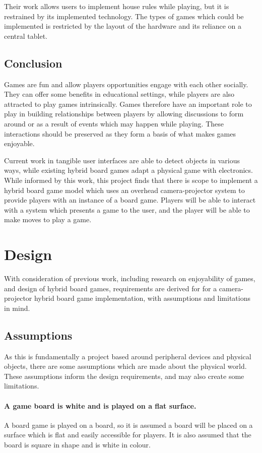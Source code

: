\documentclass[12pt]{article}
\begin{document}
Their work allows users to implement house rules while playing, but it is restrained by its implemented technology. The types of games which could be implemented is restricted by the layout of the hardware and its reliance on a central tablet. 

\subsection{Conclusion}
Games are fun and allow players opportunities engage with each other socially. 
They can offer some benefits in educational settings, while players are also attracted to play games intrinsically. 
Games therefore have an important role to play in building relationships between players by allowing discussions to form around or as a result of events which may happen while playing.
These interactions should be preserved as they form a basis of what makes games enjoyable.

Current work in tangible user interfaces are able to detect objects in various ways, while existing hybrid board games adapt a physical game with electronics. While informed by this work, this project finds that there is scope to implement a hybrid board game model which uses an overhead camera-projector system to provide players with an instance of a board game. Players will be able to interact with a system which presents a game to the user, and the player will be able to make moves to play a game.

\section{Design}
With consideration of previous work, including research on enjoyability of games, and design of hybrid board games, requirements are derived for for a camera-projector hybrid board game implementation, with assumptions and limitations in mind.

\subsection{Assumptions}
As this is fundamentally a project based around peripheral devices and physical objects, there are some assumptions which are made about the physical world. These assumptions inform the design requirements, and may also create some limitations.

\paragraph{A game board is white and is played on a flat surface.} A board game is played on a board, so it is assumed a board will be placed on a surface which is flat and easily accessible for players. It is also assumed that the board is square in shape and is white in colour.
\end{document}
